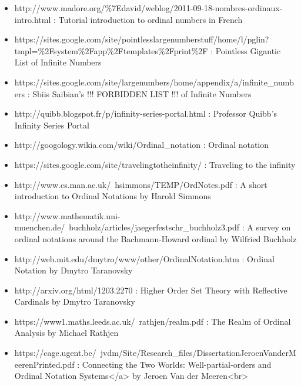 \documentclass[10pt]{article}
\begin{document}
\begin{itemize}
     \setlength{\itemsep}{1pt}
     \setlength{\parskip}{0pt}
     \setlength{\parsep}{0pt}

\item http://www.madore.org/\%7Edavid/weblog/2011-09-18-nombres-ordinaux-intro.html :
Tutorial introduction to ordinal numbers in French

\item https://sites.google.com/site/pointlesslargenumberstuff/home/l/pglin?tmpl=\%2Fsystem\%2Fapp\%2Ftemplates\%2Fprint\%2F : 
Pointless Gigantic List of Infinite Numbers

\item https://sites.google.com/site/largenumbers/home/appendix/a/infinite\_numbers : 
Sbiis Saibian's !!! FORBIDDEN LIST !!! of Infinite Numbers

\item http://quibb.blogspot.fr/p/infinity-series-portal.html : 
Professor Quibb's Infinity Series Portal

\item http://googology.wikia.com/wiki/Ordinal\_notation : 
Ordinal notation

\item https://sites.google.com/site/travelingtotheinfinity/ : 
Traveling to the infinity

\item http://www.cs.man.ac.uk/~hsimmons/TEMP/OrdNotes.pdf : 
A short introduction to Ordinal Notations by Harold Simmons

\item http://www.mathematik.uni-muenchen.de/~buchholz/articles/jaegerfestschr\_buchholz3.pdf : 
A survey on ordinal notations around the Bachmann-Howard ordinal by Wilfried Buchholz

\item http://web.mit.edu/dmytro/www/other/OrdinalNotation.htm : 
Ordinal Notation by Dmytro Taranovsky

\item http://arxiv.org/html/1203.2270 : 
Higher Order Set Theory with Reflective Cardinals by Dmytro Taranovsky

\item https://www1.maths.leeds.ac.uk/~rathjen/realm.pdf : 
The Realm of Ordinal Analysis by Michael Rathjen

\item https://cage.ugent.be/~jvdm/Site/Research\_files/DissertationJeroenVanderMeerenPrinted.pdf : 
Connecting the Two Worlds: Well-partial-orders and Ordinal Notation Systems</a> by Jeroen Van der Meeren<br>


\end{itemize}
\end{document}
